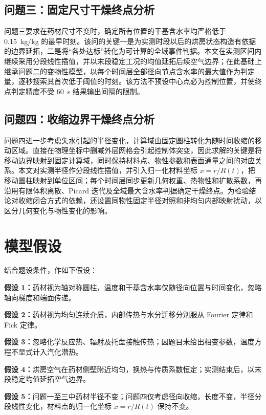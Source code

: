 \documentclass[withoutpreface,bwprint]{cumcmthesis}
\begin{document}
\subsection{问题三：固定尺寸干燥终点分析}

问题三要求在药材尺寸不变时，确定所有位置的干基含水率均严格低于 \SI{0.15}{kg/kg} 的最早时刻。该问的关键一是为实测时段以后的烘房状态构造有依据的边界延拓，二是将“各处达标”转化为可计算的全域事件判据。本文在实测区间内继续采用分段线性插值，并以末段稳定工况的均值延拓后续空气边界；在此基础上继承问题二的变物性模型，以每个时间层全部径向节点含水率的最大值作为判定量，逐秒搜索其首次低于阈值的时刻。该方法不预设中心点必为控制位置，并使终点判定精度不受 \SI{60}{s} 结果输出间隔的限制。

\subsection{问题四：收缩边界干燥终点分析}

问题四进一步考虑失水引起的半径变化，计算域由固定圆柱转化为随时间收缩的移动区域。直接在物理坐标中删减外层网格会引起控制体突变，因此求解的关键是将移动边界映射到固定计算域，同时保持材料点、物性参数和表面通量之间的对应关系。本文对实测半径作分段线性插值，并引入归一化材料坐标 \(x=r/R(t)\)，把移动圆柱映射到单位区间；每个时间层同步更新几何权重、热物性和扩散系数，再沿用有限体积离散、Picard 迭代及全域最大含水率判据确定干燥终点。为检验结论对收缩闭合方式的依赖，还设置同物性固定半径对照和非均匀内部映射扰动，以区分几何变化与物性变化的影响。

\section{模型假设}

结合题设条件，作如下假设：

\noindent\textbf{假设 1：}药材视为轴对称圆柱，温度和干基含水率仅随径向位置与时间变化，忽略轴向梯度和端面传递。

\noindent\textbf{假设 2：}药材视为均匀连续介质，内部传热与水分迁移分别服从 Fourier 定律和 Fick 定律。

\noindent\textbf{假设 3：}忽略化学反应热、辐射及托盘接触传热；因题目未给出相变参数，温度方程不显式计入汽化潜热。

\noindent\textbf{假设 4：}烘房空气在药材侧壁附近均匀，换热与传质系数恒定；实测结束后，以末段稳定均值延拓空气边界。

\noindent\textbf{假设 5：}问题一至三中药材半径不变；问题四仅考虑径向收缩，长度不变，半径分段线性变化，材料点的归一化坐标 \(x=r/R(t)\) 保持不变。
\end{document}
